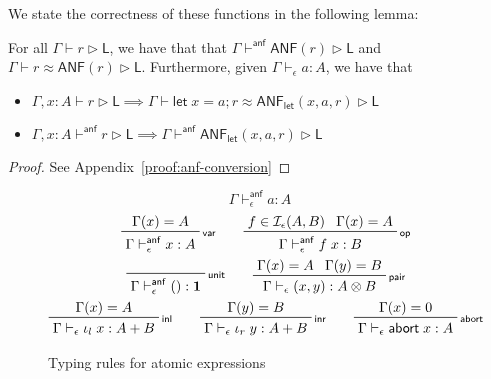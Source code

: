 \documentclass[acmsmall,screen,review]{acmart}
\newcommand{\mc}[1]{\ensuremath{\mathcal{#1}}}
\newcommand{\mb}[1]{\ensuremath{\mathbf{#1}}}
\newcommand{\ms}[1]{\ensuremath{\mathsf{#1}}}
\newcommand{\linl}[1]{\iota_l\;{#1}}
\newcommand{\linr}[1]{\iota_r\;{#1}}
\newcommand{\labort}[1]{\ms{abort}\;{#1}}
\newcommand{\letstmt}[3]{\ensuremath{\ms{let}\;#1 = #2; #3}}
\newcommand{\bhyp}[2]{#1 : #2}
\newcommand{\rle}[1]{{\scriptsize\textsf{#1}}}
\newcommand{\hasty}[4]{#1 \vdash_{#2} #3: {#4}}
\newcommand{\haslb}[3]{#1 \vdash #2 \rhd #3}
\newcommand{\ahasty}[4]{#1 \vdash_{#2}^{\ms{anf}} #3 : {#4}}
\newcommand{\ahaslb}[3]{#1 \vdash^{\ms{anf}} #2 \rhd #3}
\newcommand{\isop}[4]{#1 \in \mc{I}_{#4}(#2, #3)}
\newcommand{\teqv}{\approx}
\newcommand{\lbeq}[4]{#1 \vdash #2 \teqv #3 \rhd {#4}}
\newcommand{\letanf}[3]{\ms{ANF}_{\ms{let}}(#1, #2, #3)}
\begin{document}
We state the correctness of these functions in the following lemma:
\begin{lemma}[name=A-normalization, restate=anfconversion]
  For all $\haslb{\Gamma}{r}{\ms{L}}$, we have that that $\ahaslb{\Gamma}{\ms{ANF}(r)}{\ms{L}}$ and
  $\lbeq{\Gamma}{r}{\ms{ANF}(r)}{\ms{L}}$. Furthermore, given $\hasty{\Gamma}{\epsilon}{a}{A}$, we
  have that
  \begin{itemize}
    \item $\haslb{\Gamma, \bhyp{x}{A}}{r}{\ms{L}} \implies 
      \lbeq{\Gamma}{\letstmt{x}{a}{r}}{\letanf{x}{a}{r}}{\ms{L}}$
    \item $\ahaslb{\Gamma, \bhyp{x}{A}}{r}{\ms{L}} \implies
      \ahaslb{\Gamma}{\letanf{x}{a}{r}}{\ms{L}}$
  \end{itemize}
\end{lemma}
\begin{proof}
  See Appendix~\ref{proof:anf-conversion}
\end{proof}

\begin{figure}
  \begin{equation*}
    \boxed{\ahasty{\Gamma}{\epsilon}{a}{A}}
  \end{equation*}
  \begin{gather*}    
    \prftree[r]{\rle{var}}{\Gamma(x) = A}{\ahasty{\Gamma}{\epsilon}{x}{A}} \qquad
    \prftree[r]{\rle{op}}{\isop{f}{A}{B}{\epsilon}}{\Gamma(x) = A}
      {\ahasty{\Gamma}{\epsilon}{f\;x}{B}} \\
    \prftree[r]{\rle{unit}}{\ahasty{\Gamma}{\epsilon}{()}{\mb{1}}} \qquad
    \prftree[r]{\rle{pair}}{\Gamma(x) = A}{\Gamma(y) = B}
      {\hasty{\Gamma}{\epsilon}{(x, y)}{A \otimes B}} \\
    \prftree[r]{\rle{inl}}{\Gamma(x) = A}
      {\hasty{\Gamma}{\epsilon}{\linl{x}}{A + B}} \qquad
    \prftree[r]{\rle{inr}}{\Gamma(y) = B}
      {\hasty{\Gamma}{\epsilon}{\linr{y}}{A + B}} \qquad
    \prftree[r]{\rle{abort}}{\Gamma(x) = 0}
      {\hasty{\Gamma}{\epsilon}{\labort{x}}{A}}
  \end{gather*}
  \caption{Typing rules for atomic expressions}
  \Description{}
  \label{fig:ssa-ops}
\end{figure}
\end{document}
